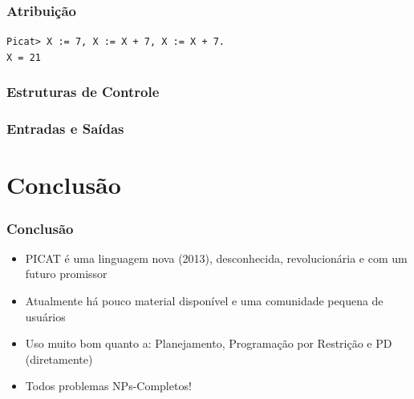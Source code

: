 
\begin{frame}
    \frametitle{Atribuição}
     \texttt{Picat> X := 7, X := X + 7, X := X + 7.}\\
     \texttt{X = 21}
\end{frame}


\begin{frame}
    \frametitle{Estruturas de Controle}
        
     
    
\end{frame}


\begin{frame}
    \frametitle{Entradas e Saídas}
  
  
  
  
\end{frame}



\section{Conclusão}
\begin{frame}
    \frametitle{Conclusão}
    \begin{itemize}
    \item PICAT é uma linguagem nova (2013), 
    desconhecida, revolucionária e com um futuro promissor
    
    \item Atualmente há pouco material disponível e uma comunidade pequena de usuários

    \item Uso muito bom quanto a: Planejamento, Programação por Restrição e PD (diretamente)
    
    \item Todos problemas NPs-Completos!
    \end{itemize}
\end{frame}

